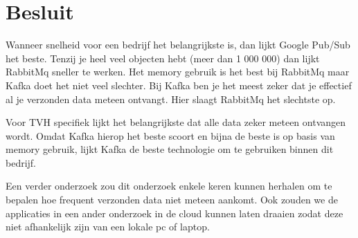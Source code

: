 
\chapter{Besluit}
\label{ch:besluit}

Wanneer snelheid voor een bedrijf het belangrijkste is, dan lijkt Google Pub/Sub het beste. Tenzij je heel veel objecten hebt (meer dan 1 000 000) dan lijkt RabbitMq sneller te werken. Het memory gebruik is het best bij RabbitMq maar Kafka doet het niet veel slechter. Bij Kafka ben je het meest zeker dat je effectief al je verzonden data meteen ontvangt. Hier slaagt RabbitMq het slechtste op.

Voor TVH specifiek lijkt het belangrijkste dat alle data zeker meteen ontvangen wordt. Omdat Kafka hierop het beste scoort en bijna de beste is op basis van memory gebruik, lijkt Kafka de beste technologie om te gebruiken binnen dit bedrijf.

Een verder onderzoek zou dit onderzoek enkele keren kunnen herhalen om te bepalen hoe frequent verzonden data niet meteen aankomt. Ook zouden we de applicaties in een ander onderzoek in de cloud kunnen laten draaien zodat deze niet afhankelijk zijn van een lokale pc of laptop.
